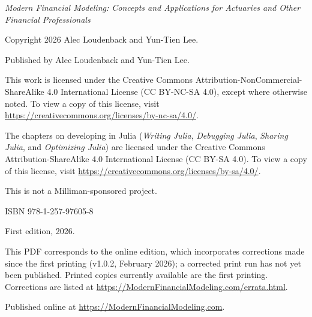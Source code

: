 \thispagestyle{empty}
\vspace*{\fill}
\begin{center}
\begin{minipage}{0.85\textwidth}
\centering

\textit{Modern Financial Modeling: Concepts and Applications for Actuaries and Other Financial Professionals}

\bigskip

Copyright \textcopyright{} 2026 Alec Loudenback and Yun-Tien Lee.

\medskip

Published by Alec Loudenback and Yun-Tien Lee.

\medskip

This work is licensed under the Creative Commons Attribution-NonCommercial-ShareAlike 4.0 International License (CC BY-NC-SA 4.0), except where otherwise noted. To view a copy of this license, visit \url{https://creativecommons.org/licenses/by-nc-sa/4.0/}.

\medskip

The chapters on developing in Julia (\emph{Writing Julia}, \emph{Debugging Julia}, \emph{Sharing Julia}, and \emph{Optimizing Julia}) are licensed under the Creative Commons Attribution-ShareAlike 4.0 International License (CC BY-SA 4.0). To view a copy of this license, visit \url{https://creativecommons.org/licenses/by-sa/4.0/}.

\medskip

This is not a Milliman-sponsored project.

\bigskip

ISBN 978-1-257-97605-8

\medskip

First edition, 2026.

\medskip

This PDF corresponds to the online edition, which incorporates corrections made since the first printing (v1.0.2, February 2026); a corrected print run has not yet been published. Printed copies currently available are the first printing. Corrections are listed at \url{https://ModernFinancialModeling.com/errata.html}.

\medskip

Published online at \url{https://ModernFinancialModeling.com}.

\end{minipage}
\end{center}
\vspace*{\fill}
\clearpage

